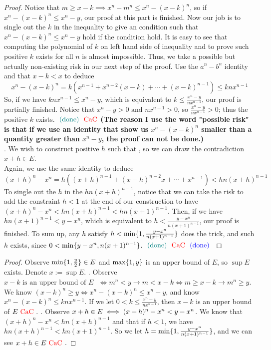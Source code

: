 \documentclass{report}
\begin{document}
\begin{proof}
Notice that $m\geq x-k\implies x^n-m^n\leq x^n-(x-k)^n$, so if $x^n-(x-k)^n\leq x^n-y$, our proof at this part is finished. Now our job is to single out the $k$ in the inequality to give an condition such that $x^n-(x-k)^n\leq x^n-y$ hold if the condition hold. It is easy to see that computing the polynomial of $k$ on left hand side of inequality and to prove such positive $k$ exists for all $n$ is almost impossible. Thus, we take a possible but actually non-existing risk in our next step of the proof. Use the $a^n-b^n$ identity and that $x-k<x$ to deduce
\begin{equation}
x^n-(x-k)^n=k(x^{n-1}+x^{n-2}(x-k)+\cdots +(x-k)^{n-1})\leq knx^{n-1}
\end{equation}
So, if we have $knx^{n-1}\leq x^n-y$, which is equivalent to $k\leq \frac{x^n-y}{nx^{n-1}}$, our proof is partially finished. Notice that $x^n-y>0\text{ and }nx^{n-1}>0$, so $\frac{x^n-y}{nx^{n-1}}>0$; thus the positive $k$ exists.  $\textcolor{teal}{\text{ (done) }}\text{ \textcolor{red}{CaC} }$\textbf{(The reason I use the word "possible risk" is that if we use an identity that show us $x^n-(x-k)^n$ smaller than a quantity greater than $x^n-y$, the proof can not be done.)} \\

. We wish to construct positive $h$ such that , so we can draw the contradiction $x+h\in E$.\\

Again, we use the same identity to deduce
 \begin{equation}
   (x+h)^n-x^n=h((x+h)^{n-1}+(x+h)^{n-2}x+\cdots +x^{n-1})<hn(x+h)^{n-1}
\end{equation}
To single out the $h$ in the  $hn(x+h)^{n-1}$, notice that we can take the risk to add the constraint $h<1$ at the end of our construction to have $(x+h)^n-x^n<hn(x+h)^{n-1}<hn(x+1)^{n-1}$. Then, if we have $hn(x+1)^{n-1}<y-x^n$, which is equivalent to $h<\frac{y-x^n}{n(x+1)^{n-1}} $, our proof is finished. To sum up, any $h$ satisfy  $h<\min \{ 1,\frac{y-x^n}{n(x+1)^{n-1}} \}$ does the trick, and such $h$ exists, since  $0<\min \{ y-x^n,n(x+1)^{n-1} \}$. $\textcolor{teal}{\text{ (done) }}\text{ \textcolor{red}{CaC} }\textcolor{blue}{\text{ (done) }}$   
\end{proof}
\begin{proof}
  Observe $\min \{ 1,\frac{y}{2} \}\in E$ and $\max \{ 1,y \}$ is an upper bound of $E$, so $\sup E$ exists.  Denote $x:=\sup E$. . Observe $x-k\text{ is an upper bound of $E$ }\iff m^n<y\longrightarrow m<x-k\iff m\geq x-k\longrightarrow m^n\geq y$. We know $(x-k)^n\geq y\iff x^n-(x-k)^n\leq x^n-y$, and know $x^n-(x-k)^n\leq knx^{n-1}$. If we let $0<k\leq \frac{x^n-y}{nx^{n-1}}$, then $x-k$ is an upper bound of  $E\text{ \textcolor{red}{CaC} }.$ . Observe $x+h\in E\iff (x+h)^n-x^n<y-x^n$. We know that $(x+h)^n-x^n<hn(x+h)^{n-1}$ and that if $h<1$, we have  $hn(x+h)^{n-1}<hn(x+1)^{n-1}$. So we let  $h=\min \{ 1,\frac{y-x^n}{n(x+1)^{n-1}} \}$, and we can see $x+h\in E\text{ \textcolor{red}{CaC} }$. 
\end{proof}
\end{document}
